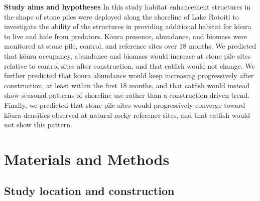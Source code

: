 \documentclass[
  12pt,
  a4paper,
]{scrbook}
\begin{document}
\textbf{Study aims and hypotheses} In this study habitat enhancement
structures in the shape of stone piles were deployed along the shoreline
of Lake Rotoiti to investigate the ability of the structures in
providing additional habitat for kōura to live and hide from predators.
Kōura presence, abundance, and biomass were monitored at stone pile,
control, and reference sites over 18 months. We predicted that kōura
occupancy, abundance and biomass would increase at stone pile sites
relative to control sites after construction, and that catfish would not
change. We further predicted that kōura abundance would keep increasing
progressively after construction, at least within the first 18 months,
and that catfish would instead show seasonal patterns of shoreline use
rather than a construction-driven trend. Finally, we predicted that
stone pile sites would progressively converge toward kōura densities
observed at natural rocky reference sites, and that catfish would not
show this pattern.


\chapter{Materials and Methods}\label{materials-and-methods-3}

\section{Study location and
construction}\label{study-location-and-construction}
\end{document}
